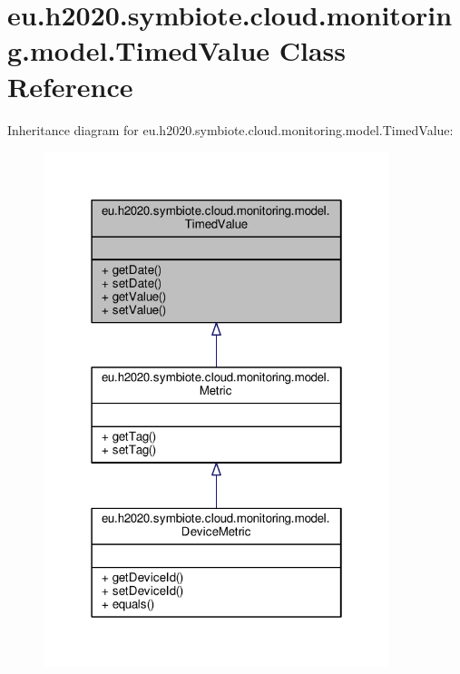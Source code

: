 \hypertarget{classeu_1_1h2020_1_1symbiote_1_1cloud_1_1monitoring_1_1model_1_1TimedValue}{}\section{eu.\+h2020.\+symbiote.\+cloud.\+monitoring.\+model.\+Timed\+Value Class Reference}
\label{classeu_1_1h2020_1_1symbiote_1_1cloud_1_1monitoring_1_1model_1_1TimedValue}


Inheritance diagram for eu.\+h2020.\+symbiote.\+cloud.\+monitoring.\+model.\+Timed\+Value\+:
\nopagebreak
\begin{figure}[H]
\begin{center}
\leavevmode
\includegraphics[width=286pt]{classeu_1_1h2020_1_1symbiote_1_1cloud_1_1monitoring_1_1model_1_1TimedValue__inherit__graph}
\end{center}
\end{figure}


